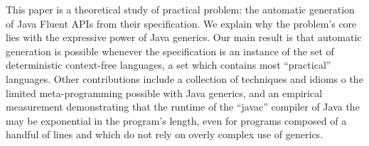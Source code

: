 This paper is a theoretical study of practical problem:
  the automatic generation of Java Fluent APIs from their specification.
We explain why the problem's core lies with 
  the expressive power of Java generics.
Our main result is that automatic generation is possible whenever 
  the specification is an instance of the set of deterministic context-free languages,
  a set which contains most ``practical'' languages.
Other contributions include a collection of techniques and idioms o
  the limited meta-programming possible with Java generics, 
  and an empirical measurement demonstrating that the runtime of
  the ``javac'' compiler of Java the may be exponential in
  the program's length, even for programs composed of 
  a handful of lines and which do not rely on overly 
  complex use of generics.
